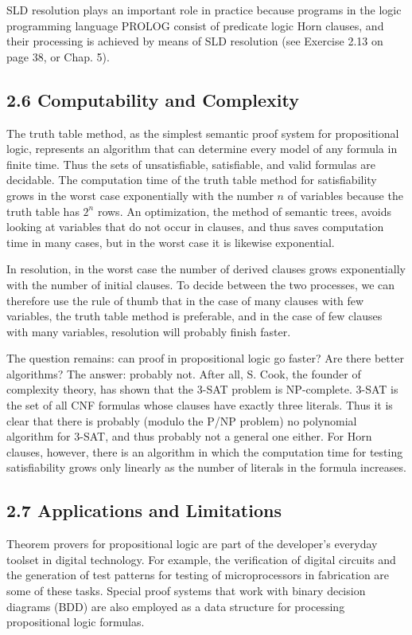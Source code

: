 \documentclass[10pt]{article}
\begin{document}
SLD resolution plays an important role in practice because programs in the logic programming language PROLOG consist of predicate logic Horn clauses, and their processing is achieved by means of SLD resolution (see Exercise 2.13 on page 38, or Chap. 5).

\subsection*{2.6 Computability and Complexity}
The truth table method, as the simplest semantic proof system for propositional logic, represents an algorithm that can determine every model of any formula in finite time. Thus the sets of unsatisfiable, satisfiable, and valid formulas are decidable. The computation time of the truth table method for satisfiability grows in the worst case exponentially with the number $n$ of variables because the truth table has $2^{n}$ rows. An optimization, the method of semantic trees, avoids looking at variables that do not occur in clauses, and thus saves computation time in many cases, but in the worst case it is likewise exponential.

In resolution, in the worst case the number of derived clauses grows exponentially with the number of initial clauses. To decide between the two processes, we can therefore use the rule of thumb that in the case of many clauses with few variables, the truth table method is preferable, and in the case of few clauses with many variables, resolution will probably finish faster.

The question remains: can proof in propositional logic go faster? Are there better algorithms? The answer: probably not. After all, S. Cook, the founder of complexity theory, has shown that the 3-SAT problem is NP-complete. 3-SAT is the set of all CNF formulas whose clauses have exactly three literals. Thus it is clear that there is probably (modulo the P/NP problem) no polynomial algorithm for 3-SAT, and thus probably not a general one either. For Horn clauses, however, there is an algorithm in which the computation time for testing satisfiability grows only linearly as the number of literals in the formula increases.

\subsection*{2.7 Applications and Limitations}
Theorem provers for propositional logic are part of the developer's everyday toolset in digital technology. For example, the verification of digital circuits and the generation of test patterns for testing of microprocessors in fabrication are some of these tasks. Special proof systems that work with binary decision diagrams (BDD) are also employed as a data structure for processing propositional logic formulas.
\end{document}
